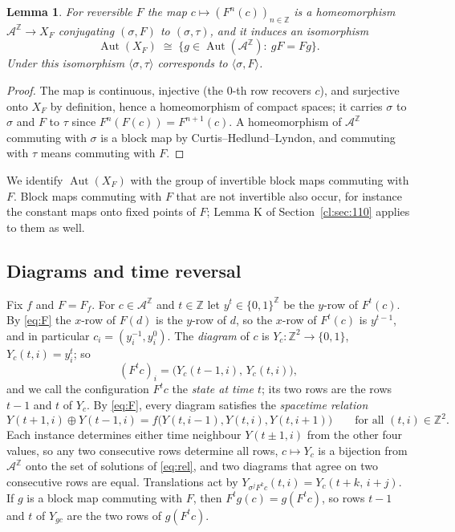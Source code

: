 \documentclass[11pt]{amsart}
\newtheorem{lemma}[theorem]{Lemma}
\theoremstyle{definition}
\theoremstyle{remark}
\theoremstyle{plain}
\newcommand{\Z}{\mathbb{Z}}
\newcommand{\A}{\mathcal{A}}
\newcommand{\Aut}{\operatorname{Aut}}
\newcommand{\sh}{\sigma}
\begin{document}
\begin{lemma}\label{lem:spacetime}
For reversible $F$ the map $c\mapsto(F^n(c))_{n\in\Z}$ is a homeomorphism $\A^{\Z}\to X_F$ conjugating $(\sh,F)$ to $(\sh,\tau)$, and it induces an isomorphism
\[
\Aut(X_F)\;\cong\;\{g\in\Aut(\A^{\Z}):\ gF=Fg\}.
\]
Under this isomorphism $\langle\sh,\tau\rangle$ corresponds to $\langle\sh,F\rangle$.
\end{lemma}

\begin{proof}
The map is continuous, injective (the $0$-th row recovers $c$), and surjective onto $X_F$ by definition, hence a homeomorphism of compact spaces; it carries $\sh$ to $\sh$ and $F$ to $\tau$ since $F^{n}(F(c))=F^{n+1}(c)$. A homeomorphism of $\A^{\Z}$ commuting with $\sh$ is a block map by Curtis--Hedlund--Lyndon, and commuting with $\tau$ means commuting with $F$.
\end{proof}

We identify $\Aut(X_F)$ with the group of invertible block maps commuting with $F$. Block maps commuting with $F$ that are not invertible also occur, for instance the constant maps onto fixed points of $F$; Lemma K of Section~\ref{cl:sec:110} applies to them as well.

\subsection{Diagrams and time reversal}\label{sec:diagrams}

Fix $f$ and $F=F_f$. For $c\in\A^{\Z}$ and $t\in\Z$ let $y^t\in\{0,1\}^{\Z}$ be the $y$-row of $F^t(c)$. By \eqref{eq:F} the $x$-row of $F(d)$ is the $y$-row of $d$, so the $x$-row of $F^t(c)$ is $y^{t-1}$, and in particular $c_i=(y^{-1}_i,y^0_i)$. The \emph{diagram} of $c$ is $Y_c\colon\Z^2\to\{0,1\}$, $Y_c(t,i)=y^t_i$; so
\[
(F^tc)_i=\bigl(Y_c(t-1,i),\,Y_c(t,i)\bigr),
\]
and we call the configuration $F^tc$ the \emph{state at time $t$}; its two rows are the rows $t-1$ and $t$ of $Y_c$. By \eqref{eq:F}, every diagram satisfies the \emph{spacetime relation}
\begin{equation}\label{eq:rel}
Y(t+1,i)\oplus Y(t-1,i)=f\bigl(Y(t,i-1),Y(t,i),Y(t,i+1)\bigr)\qquad\text{for all }(t,i)\in\Z^2.
\end{equation}
Each instance determines either time neighbour $Y(t\pm1,i)$ from the other four values, so any two consecutive rows determine all rows, $c\mapsto Y_c$ is a bijection from $\A^{\Z}$ onto the set of solutions of \eqref{eq:rel}, and two diagrams that agree on two consecutive rows are equal. Translations act by $Y_{\sh^jF^kc}(t,i)=Y_c(t+k,\,i+j)$. If $g$ is a block map commuting with $F$, then $F^tg(c)=g(F^tc)$, so rows $t-1$ and $t$ of $Y_{gc}$ are the two rows of $g(F^tc)$.
\end{document}
